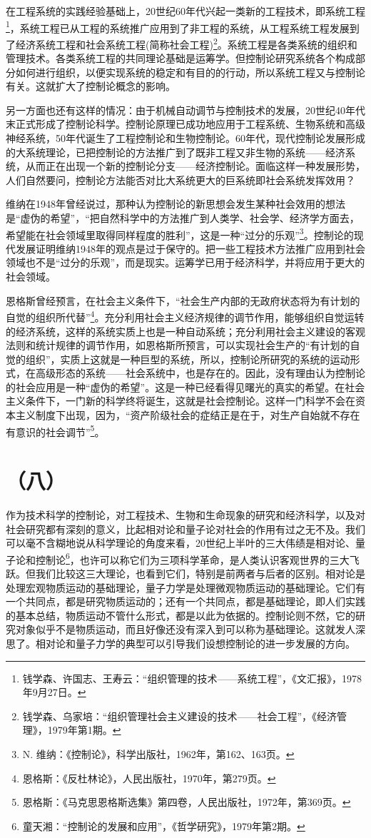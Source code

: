 在工程系统的实践经验基础上，20世纪60年代兴起一类新的工程技术，即系统工程\footnote{钱学森、许国志、王寿云：“组织管理的技术——系统工程”，《文汇报》，1978年9月27日。}，系统工程已从工程的系统推广应用到了非工程的系统，从工程系统工程发展到了经济系统工程和社会系统工程(简称社会工程)\footnote{钱学森、乌家培：“组织管理社会主义建设的技术——社会工程”，《经济管理》，1979年第1期。}。系统工程是各类系统的组织和管理技术。各类系统工程的共同理论基础是运筹学。但控制论研究系统各个构成部分如何进行组织，以便实现系统的稳定和有目的的行动，所以系统工程又与控制论有关。这就扩大了控制论概念的影响。

另一方面也还有这样的情况：由于机械自动调节与控制技术的发展，20世纪40年代末正式形成了控制论科学。控制论原理已成功地应用于工程系统、生物系统和高级神经系统，50年代诞生了工程控制论和生物控制论。60年代，现代控制论发展形成的大系统理论，已把控制论的方法推广到了既非工程又非生物的系统——经济系统，从而正在出现一个新的控制论分支——经济控制论。面临这样一种发展形势，人们自然要问，控制论方法能否对比大系统更大的巨系统即社会系统发挥效用？

维纳在1948年曾经说过，那种认为控制论的新思想会发生某种社会效用的想法是“虚伪的希望”，“把自然科学中的方法推广到人类学、社会学、经济学方面去，希望能在社会领域里取得同样程度的胜利”，这是一种“过分的乐观”\footnote{N. 维纳：《控制论》，科学出版社，1962年，第162、163页。}。控制论的现代发展证明维纳1948年的观点是过于保守的。把一些工程技术方法推广应用到社会领域也不是“过分的乐观”，而是现实。运筹学已用于经济科学，并将应用于更大的社会领域。

恩格斯曾经预言，在社会主义条件下，“社会生产内部的无政府状态将为有计划的自觉的组织所代替”\footnote{恩格斯：《反杜林论》，人民出版社，1970年，第279页。}。充分利用社会主义经济规律的调节作用，能够组织自觉运转的经济系统，这样的系统实质上也是一种自动系统；充分利用社会主义建设的客观法则和统计规律的调节作用，如恩格斯所预言，可以实现社会生产的“有计划的自觉的组织”，实质上这就是一种巨型的系统，所以，控制论所研究的系统的运动形式，在高级形态的系统——社会系统中，也是存在的。因此，没有理由认为控制论的社会应用是一种“虚伪的希望”。这是一种已经看得见曙光的真实的希望。在社会主义条件下，一门新的科学终将诞生，这就是社会控制论。这样一门科学不会在资本主义制度下出现，因为，“资产阶级社会的症结正是在于，对生产自始就不存在有意识的社会调节”\footnote{恩格斯：《马克思恩格斯选集》第四卷，人民出版社，1972年，第369页。}。

\section*{（八）}
作为技术科学的控制论，对工程技术、生物和生命现象的研究和经济科学，以及对社会研究都有深刻的意义，比起相对论和量子论对社会的作用有过之无不及。我们可以毫不含糊地说从科学理论的角度来看，20世纪上半叶的三大伟绩是相对论、量子论和控制论\footnote{童天湘：“控制论的发展和应用”，《哲学研究》，1979年第2期。}，也许可以称它们为三项科学革命，是人类认识客观世界的三大飞跃。但我们比较这三大理论，也看到它们，特别是前两者与后者的区别。相对论是处理宏观物质运动的基础理论，量子力学是处理微观物质运动的基础理论。它们有一个共同点，都是研究物质运动的；还有一个共同点，都是基础理论，即人们实践的基本总结，物质运动不管什么形式，都是以此为依据的。控制论则不然，它的研究对象似乎不是物质运动，而且好像还没有深入到可以称为基础理论。这就发人深思了。相对论和量子力学的典型可以引导我们设想控制论的进一步发展的方向。

